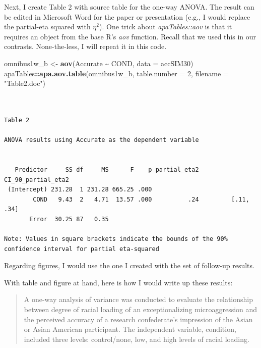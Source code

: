 \documentclass[
  11pt,
]{book}
\newenvironment{Shaded}{\begin{snugshade}}{\end{snugshade}}
\newcommand{\AttributeTok}[1]{\textcolor[rgb]{0.27,0.27,0.27}{#1}}
\newcommand{\DecValTok}[1]{\textcolor[rgb]{0.06,0.06,0.06}{#1}}
\newcommand{\FunctionTok}[1]{\textcolor[rgb]{0.27,0.27,0.27}{\textbf{#1}}}
\newcommand{\NormalTok}[1]{#1}
\newcommand{\OtherTok}[1]{\textcolor[rgb]{0.37,0.37,0.37}{#1}}
\newcommand{\SpecialCharTok}[1]{\textcolor[rgb]{0.43,0.43,0.43}{\textbf{#1}}}
\newcommand{\StringTok}[1]{\textcolor[rgb]{0.5,0.5,0.5}{#1}}
\begin{document}
Next, I create Table 2 with source table for the one-way ANOVA. The result can be edited in Microsoft Word for the paper or presentation (e.g., I would replace the partial-eta squared with \(\eta^2\)). One trick about \emph{apaTables::aov} is that it requires an object from the base R's \emph{aov} function. Recall that we used this in our contrasts. None-the-less, I will repeat it in this code.

\begin{Shaded}
\begin{Highlighting}[]
\NormalTok{omnibus1w\_b }\OtherTok{\textless{}{-}} \FunctionTok{aov}\NormalTok{(Accurate }\SpecialCharTok{\textasciitilde{}}\NormalTok{ COND, }\AttributeTok{data =}\NormalTok{ accSIM30)}
\NormalTok{apaTables}\SpecialCharTok{::}\FunctionTok{apa.aov.table}\NormalTok{(omnibus1w\_b, }\AttributeTok{table.number =} \DecValTok{2}\NormalTok{, }\AttributeTok{filename =} \StringTok{"Table2.doc"}\NormalTok{)}
\end{Highlighting}
\end{Shaded}

\begin{verbatim}


Table 2 

ANOVA results using Accurate as the dependent variable
 

   Predictor     SS df     MS      F    p partial_eta2 CI_90_partial_eta2
 (Intercept) 231.28  1 231.28 665.25 .000                                
        COND   9.43  2   4.71  13.57 .000          .24         [.11, .34]
       Error  30.25 87   0.35                                            

Note: Values in square brackets indicate the bounds of the 90% confidence interval for partial eta-squared 
\end{verbatim}

Regarding figures, I would use the one I created with the set of follow-up results.

With table and figure at hand, here is how I would write up these results:

\begin{quote}
A one-way analysis of variance was conducted to evaluate the relationship between degree of racial loading of an exceptionalizing microaggression and the perceived accuracy of a research confederate's impression of the Asian or Asian American participant. The independent variable, condition, included three levels: control/none, low, and high levels of racial loading.
\end{quote}
\end{document}
